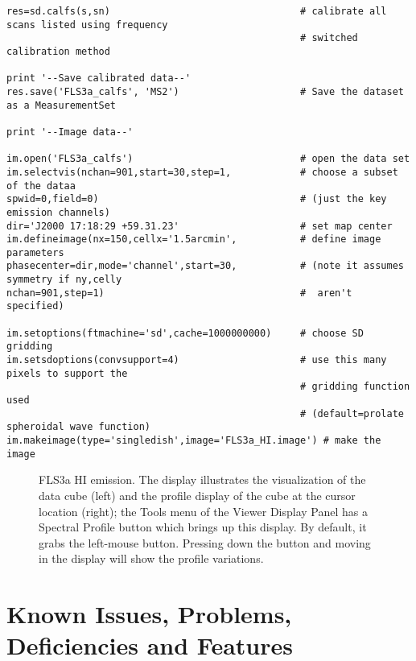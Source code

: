 \begin{verbatim}
res=sd.calfs(s,sn)                                 # calibrate all scans listed using frequency 
                                                   # switched calibration method

print '--Save calibrated data--'
res.save('FLS3a_calfs', 'MS2')                     # Save the dataset as a MeasurementSet

print '--Image data--'
                                                                
im.open('FLS3a_calfs')                             # open the data set
im.selectvis(nchan=901,start=30,step=1,            # choose a subset of the dataa   
spwid=0,field=0)                                   # (just the key emission channels)                 
dir='J2000 17:18:29 +59.31.23'                     # set map center                
im.defineimage(nx=150,cellx='1.5arcmin',           # define image parameters
phasecenter=dir,mode='channel',start=30,           # (note it assumes symmetry if ny,celly 
nchan=901,step=1)                                  #  aren't specified)
                                                                       
im.setoptions(ftmachine='sd',cache=1000000000)     # choose SD gridding                
im.setsdoptions(convsupport=4)                     # use this many pixels to support the 
                                                   # gridding function used       
                                                   # (default=prolate spheroidal wave function)  
im.makeimage(type='singledish',image='FLS3a_HI.image') # make the image
\end{verbatim}
\normalsize

\begin{figure}[h!]
\caption{\label{fig:HI_cube} FLS3a HI emission. The display
  illustrates the visualization of the data cube (left) and the
  profile display of the cube at the cursor location (right); the
  Tools menu of the Viewer Display Panel has a Spectral Profile button
  which brings up this display. By default, it grabs the left-mouse
  button. Pressing down the button and moving in the display will show
  the profile variations. }
\hrulefill
\end{figure}

\section{Known Issues, Problems, Deficiencies and Features}
\label{section:sd.issues}

